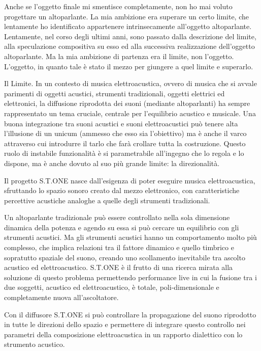 \documentclass[a4paper,11pt]{article}
\begin{document}
Anche se l'oggetto finale mi smentisce completamente, non ho mai voluto
progettare un altoparlante. La mia ambizione era superare un certo
limite, che lentamente ho identificato appartenere intrinsecamente
all'oggetto altoparlante. Lentamente, nel corso degli ultimi anni, sono
passato dalla descrizione del limite, alla speculazione compositiva su
esso ed alla successiva realizzazione dell'oggetto altoparlante. Ma la
mia ambizione di partenza era il limite, non l'oggetto. L'oggetto, in
quanto tale è stato il mezzo per giungere a quel limite e superarlo.

Il Limite. In un contesto di musica elettroacustica, ovvero di musica
che si avvale parimenti di oggetti acustici, strumenti tradizionali,
oggetti elettrici ed elettronici, la diffusione riprodotta dei suoni
(mediante altoparlanti) ha sempre rappresentato un tema cruciale,
centrale per l'equilibrio acustico e musicale. Una buona integrazione
tra suoni acustici e suoni elettroacustici può tenere alta l'illusione
di un unicum (ammesso che esso sia l'obiettivo) ma è anche il varco
attraverso cui introdurre il tarlo che farà crollare tutta la
costruzione. Questo ruolo di instabile funzionalità è si parametrabile
all'ingegno che lo regola e lo dispone, ma è anche dovuto al suo più
grande limite: la direzionalità.

Il progetto S.T.ONE nasce dall'esigenza di poter eseguire musica
elettroacustica, sfruttando lo spazio sonoro creato dal mezzo
elettronico, con caratteristiche percettive acustiche analoghe a quelle
degli strumenti tradizionali.

Un altoparlante tradizionale può essere controllato nella sola
dimensione dinamica della potenza e agendo su essa si può cercare un
equilibrio con gli strumenti acustici. Ma gli strumenti acustici hanno
un comportamento molto più complesso, che implica relazioni tra il
fattore dinamico e quello timbrico e sopratutto spaziale del suono,
creando uno scollamento inevitabile tra ascolto acustico ed
elettroacustico. S.T.ONE è il frutto di una ricerca mirata alla
soluzione di questo problema permettendo performance live in cui la
fusione tra i due soggetti, acustico ed elettroacustico, è totale,
poli-dimensionale e completamente nuova all'ascoltatore.

Con il diffusore S.T.ONE si può controllare la propagazione del suono
riprodotto in tutte le direzioni dello spazio e permettere di integrare
questo controllo nei parametri della composizione elettroacustica in un
rapporto dialettico con lo strumento acustico.
\end{document}
